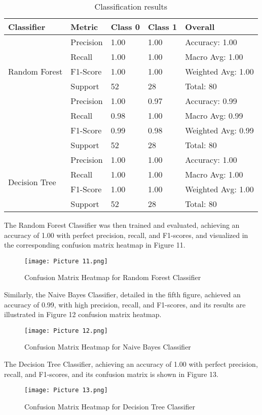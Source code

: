\documentclass[conference]{IEEEtran}
\begin{document}
\begin{table}[h!]
\centering
\caption{Classification results}
\label{tab:classification_reports}
\begin{tabular}{|l|l|l|l|l|}
\hline
\textbf{Classifier} & \textbf{Metric} & \textbf{Class 0} & \textbf{Class 1} & \textbf{Overall} \\ \hline
\multirow{5}{*}{Random Forest} & Precision & 1.00 & 1.00 & Accuracy: 1.00 \\ \cline{2-5} 
 & Recall & 1.00 & 1.00 & Macro Avg: 1.00 \\ \cline{2-5} 
 & F1-Score & 1.00 & 1.00 & Weighted Avg: 1.00 \\ \cline{2-5} 
 & Support & 52 & 28 & Total: 80 \\ \hline
\multirow{5}{*}{Naive Bayes} & Precision & 1.00 & 0.97 & Accuracy: 0.99 \\ \cline{2-5} 
 & Recall & 0.98 & 1.00 & Macro Avg: 0.99 \\ \cline{2-5} 
 & F1-Score & 0.99 & 0.98 & Weighted Avg: 0.99 \\ \cline{2-5} 
 & Support & 52 & 28 & Total: 80 \\ \hline
\multirow{5}{*}{Decision Tree} & Precision & 1.00 & 1.00 & Accuracy: 1.00 \\ \cline{2-5} 
 & Recall & 1.00 & 1.00 & Macro Avg: 1.00 \\ \cline{2-5} 
 & F1-Score & 1.00 & 1.00 & Weighted Avg: 1.00 \\ \cline{2-5} 
 & Support & 52 & 28 & Total: 80 \\ \hline
\end{tabular}
\end{table}


The Random Forest Classifier was then trained and evaluated, achieving an accuracy of 1.00 with perfect precision, recall, and F1-scores, and visualized in the corresponding confusion matrix heatmap in Figure 11.

\begin{figure}
\centering
\texttt{[image: Picture 11.png]}
\caption{Confusion Matrix Heatmap for Random Forest Classifier} \label{fig11}
\end{figure}

Similarly, the Naive Bayes Classifier, detailed in the fifth figure, achieved an accuracy of 0.99, with high precision, recall, and F1-scores, and its results are illustrated in Figure 12 confusion matrix heatmap. 

\begin{figure}
\centering
\texttt{[image: Picture 12.png]}
\caption{Confusion Matrix Heatmap for Naive Bayes Classifier} \label{fig12}
\end{figure}
The Decision Tree Classifier, achieving an accuracy of 1.00 with perfect precision, recall, and F1-scores, and its confusion matrix is shown in Figure 13.
\begin{figure}
\centering
\texttt{[image: Picture 13.png]}
\caption{Confusion Matrix Heatmap for Decision Tree Classifier} \label{fig13}
\end{figure}
\end{document}
